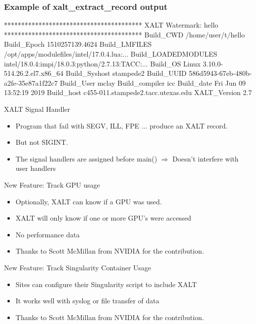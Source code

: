 \documentclass{beamer}
\begin{document}
\begin{frame}[fragile]
    \frametitle{Example of xalt\_extract\_record output}
 {\small
    \begin{semiverbatim}
****************************************
XALT Watermark: hello
****************************************
Build\_CWD                /home/user/t/hello
Build\_Epoch              1510257139.4624
Build\_LMFILES            /opt/apps/modulefiles/intel/17.0.4.lua:...
Build\_LOADEDMODULES      intel/18.0.4:impi/18.0.3:python/2.7.13:TACC:...
Build\_OS                 Linux 3.10.0-514.26.2.el7.x86_64
Build\_Syshost            stampede2
Build\_UUID               586d5943-67eb-480b-a2fe-35e87a1f22c7
Build\_User               mclay
Build\_compiler           icc
Build\_date               Fri Jun 09 13:52:19 2019
Build\_host               c455-011.stampede2.tacc.utexas.edu
XALT\_Version             2.7
    \end{semiverbatim}
}
\end{frame}


\begin{frame}{XALT Signal Handler}
  \begin{itemize}
    \item Program that fail with SEGV, ILL, FPE ... produce an XALT record.
    \item But not SIGINT.
    \item The signal handlers are assigned before main() $\Rightarrow$
      Doesn't interfere with user handlers
  \end{itemize}
\end{frame}

\begin{frame}{New Feature: Track GPU usage}
  \begin{itemize}
    \item Optionally, XALT can know if a GPU was used.
    \item XALT will only know if one or more GPU's were accessed
    \item No performance data
    \item Thanks to Scott McMillan from NVIDIA for the contribution.
  \end{itemize}
\end{frame}

\begin{frame}{New Feature: Track Singularity Container Usage}
  \begin{itemize}
    \item Sites can configure their Singularity script to include XALT
    \item It works well with syslog or file transfer of data
    \item Thanks to Scott McMillan from NVIDIA for the contribution.
  \end{itemize}
\end{frame}
\end{document}
